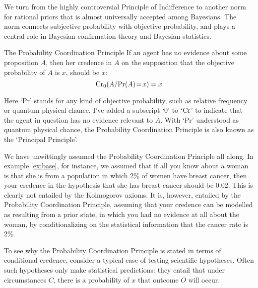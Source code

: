 
We turn from the highly controversial Principle of Indifference to
another norm for rational priors that is almost universally accepted
among Bayesians. The norm connects subjective probability with
objective probability, and plays a central role in Bayesian
confirmation theory and Bayesian statistics.

\begin{genericthm}{The Probability Coordination Principle}
  If an agent has no evidence about some proposition $A$, then her
  credence in $A$ on the supposition that the objective probability of
  $A$ is $x$, should be $x$:
  \[
    \text{Cr}_0(A / \text{Pr}(A)\!=\!x) = x
  \]
\end{genericthm}
%
Here `Pr' stands for any kind of objective probability, such as
relative frequency or quantum physical chance. I've added a subscript
`0' to `$\text{Cr}$' to indicate that the agent in question has no evidence
relevant to $A$. With `Pr' understood as quantum physical chance, the
Probability Coordination Principle is also known as the `Principal
Principle'.

We have unwittingly assumed the Probability Coordination Principle all
along. In example \ref{ex:base}, for instance, we assumed that if all you
know about a woman is that she is from a population in which 2\% of
women have breast cancer, then your credence in the hypothesis that she has
breast cancer should be 0.02. This is clearly not entailed by the
Kolmogorov axioms. It is, however, entailed by the Probability
Coordination Principle, assuming that your credence can be modelled as
resulting from a prior state, in which you had no evidence at all
about the woman, by conditionalizing on the statistical information
that the cancer rate is 2\%.

To see why the Probability Coordination Principle is stated in terms
of conditional credence, consider a typical case of testing scientific
hypotheses. Often such hypotheses only make statistical predictions:
they entail that under circumstances $C$, there is a probability of
$x$ that outcome $O$ will occur.

